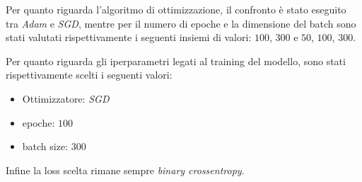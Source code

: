 Per quanto riguarda l'algoritmo di ottimizzazione, il confronto è stato eseguito
tra \textit{Adam} e \textit{SGD}, mentre per il numero di epoche e la dimensione
del batch sono stati valutati rispettivamente i seguenti insiemi di valori: $100$, $300$ e $50$,
$100$, $300$.

Per quanto riguarda gli iperparametri legati al training del modello, sono stati
rispettivamente scelti i seguenti valori:
\begin{itemize}
    \item Ottimizzatore: \textit{SGD}
    \item epoche: $100$
    \item batch size: $300$
\end{itemize}

Infine la loss scelta rimane sempre \textit{binary crossentropy}.